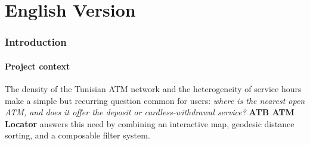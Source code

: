 \documentclass[11pt,a4paper]{article}
\begin{document}
\newpage
\part{English Version}

\begin{abstract}
\noindent
\textbf{ATB ATM Locator} is a mobile banking application designed to let Arab
Tunisian Bank customers locate, in real time, the nearest Automated Teller
Machines (ATMs) and branches, obtain reliable routing, and consult this
information even without network connectivity. From the standpoint of a senior
mobile software engineer, this paper presents and justifies the project's
defining \emph{technical choices}. The core engineering challenges addressed
are: retrieving and proximity-sorting heterogeneous geospatial data, performant
map rendering, an \emph{offline-first} strategy based on tile caching,
fine-grained control of GPS-induced battery drain, and securing the network
layer. The selected stack relies on \textbf{Flutter/Dart} for the
cross-platform interface, \textbf{flutter\_map} backed by \textbf{OpenStreetMap}
for mapping, the \textbf{Overpass API} as the ATM data source, the
\textbf{geolocator} package for location, and an offline cache in the
\textbf{MBTiles} (\textbf{SQLite}) format. We show that a layered architecture,
coupled with systematic graceful-degradation mechanisms, achieves
production-grade robustness while remaining simple to maintain and economically
sustainable (no paid proprietary keys).
\end{abstract}

\section{Introduction}
\subsection{Project context}
The density of the Tunisian ATM network and the heterogeneity of service hours
make a simple but recurring question common for users: \emph{where is the
nearest open ATM, and does it offer the deposit or cardless-withdrawal service?}
\textbf{ATB ATM Locator} answers this need by combining an interactive map,
geodesic distance sorting, and a composable filter system.
\end{document}
